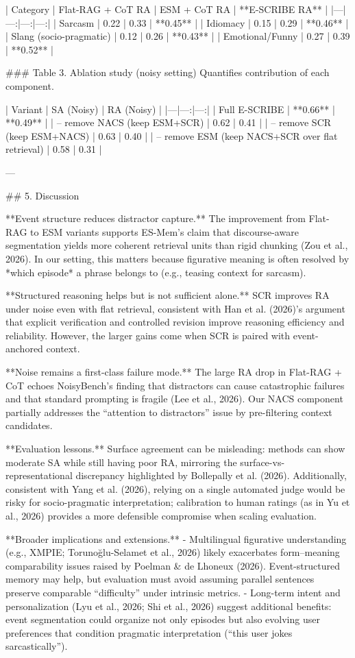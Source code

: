 | Category | Flat-RAG + CoT RA | ESM + CoT RA | **E-SCRIBE RA** |
|---|---:|---:|---:|
| Sarcasm | 0.22 | 0.33 | **0.45** |
| Idiomacy | 0.15 | 0.29 | **0.46** |
| Slang (socio-pragmatic) | 0.12 | 0.26 | **0.43** |
| Emotional/Funny | 0.27 | 0.39 | **0.52** |

### Table 3. Ablation study (noisy setting)  
Quantifies contribution of each component.

| Variant | SA (Noisy) | RA (Noisy) |
|---|---:|---:|
| Full E-SCRIBE | **0.66** | **0.49** |
| – remove NACS (keep ESM+SCR) | 0.62 | 0.41 |
| – remove SCR (keep ESM+NACS) | 0.63 | 0.40 |
| – remove ESM (keep NACS+SCR over flat retrieval) | 0.58 | 0.31 |

---

## 5. Discussion  

**Event structure reduces distractor capture.** The improvement from Flat-RAG to ESM variants supports ES-Mem’s claim that discourse-aware segmentation yields more coherent retrieval units than rigid chunking (Zou et al., 2026). In our setting, this matters because figurative meaning is often resolved by *which episode* a phrase belongs to (e.g., teasing context for sarcasm).

**Structured reasoning helps but is not sufficient alone.** SCR improves RA under noise even with flat retrieval, consistent with Han et al. (2026)’s argument that explicit verification and controlled revision improve reasoning efficiency and reliability. However, the larger gains come when SCR is paired with event-anchored context.

**Noise remains a first-class failure mode.** The large RA drop in Flat-RAG + CoT echoes NoisyBench’s finding that distractors can cause catastrophic failures and that standard prompting is fragile (Lee et al., 2026). Our NACS component partially addresses the “attention to distractors” issue by pre-filtering context candidates.

**Evaluation lessons.** Surface agreement can be misleading: methods can show moderate SA while still having poor RA, mirroring the surface-vs-representational discrepancy highlighted by Bollepally et al. (2026). Additionally, consistent with Yang et al. (2026), relying on a single automated judge would be risky for socio-pragmatic interpretation; calibration to human ratings (as in Yu et al., 2026) provides a more defensible compromise when scaling evaluation.

**Broader implications and extensions.**  
- Multilingual figurative understanding (e.g., XMPIE; Torunoğlu-Selamet et al., 2026) likely exacerbates form–meaning comparability issues raised by Poelman & de Lhoneux (2026). Event-structured memory may help, but evaluation must avoid assuming parallel sentences preserve comparable “difficulty” under intrinsic metrics.  
- Long-term intent and personalization (Lyu et al., 2026; Shi et al., 2026) suggest additional benefits: event segmentation could organize not only episodes but also evolving user preferences that condition pragmatic interpretation (“this user jokes sarcastically”).

